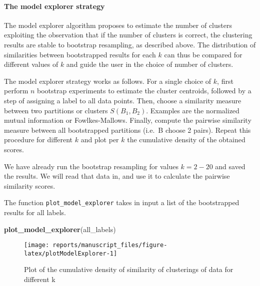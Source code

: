 \documentclass[9pt,a4paper,]{extarticle}
\newenvironment{Shaded}{\begin{snugshade}}{\end{snugshade}}
\newcommand{\KeywordTok}[1]{\textcolor[rgb]{0.13,0.29,0.53}{\textbf{#1}}}
\newcommand{\NormalTok}[1]{#1}
\begin{document}
\hypertarget{the-model-explorer-strategy}{%
\paragraph{The model explorer strategy}\label{the-model-explorer-strategy}}

The model explorer algorithm \citep{ben-hur:stability} proposes to estimate the
number of clusters exploiting the observation that if the number of clusters
is correct, the clustering results are stable to bootstrap resampling, as
described above. The distribution of similarities between bootstrapped results
for each \(k\) can thus be compared for different values of \(k\) and guide the
user in the choice of number of clusters.

The model explorer strategy works as follows. For a single choice of \(k\),
first perform \(n\) bootstrap experiments to estimate the cluster centroids,
followed by a step of assigning a label to all data points. Then, choose a
similarity measure between two partitions or clusters \(S(B_1, B_2)\). Examples
are the normalized mutual information or Fowlkes-Mallows. Finally, compute the
pairwise similarity measure between all bootstrapped partitions (i.e.~B choose
2 pairs). Repeat this procedure for different \(k\) and plot per \(k\) the
cumulative density of the obtained scores.

We have already run the bootstrap resampling for values \(k=2-20\) and saved the
results. We will read that data in, and use it to calculate the pairwise
similarity scores.

The function \texttt{plot\_model\_explorer} takes in input a list of the bootstrapped
results for all labels.

\begin{Shaded}
\begin{Highlighting}[]
\KeywordTok{plot_model_explorer}\NormalTok{(all_labels)}
\end{Highlighting}
\end{Shaded}

\begin{figure}[H]

{\centering \texttt{[image: reports/manuscript\_files/figure-latex/plotModelExplorer-1]} 

}

\caption{Plot of the cumulative density of similarity of clusterings of data for different k}\label{fig:plotModelExplorer}
\end{figure}
\end{document}
